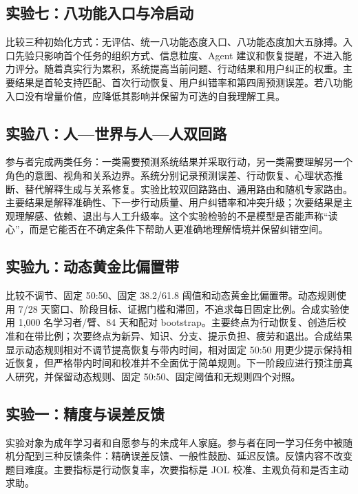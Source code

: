 \documentclass[UTF8,a4paper,11pt]{ctexart}
\begin{document}
\subsection{实验七：八功能入口与冷启动}

比较三种初始化方式：无评估、统一八功能态度入口、八功能态度加大五脉搏。入口先验只影响首个任务的组织方式、信息粒度、Agent 建议和恢复提醒，不进入能力评分。随着真实行为累积，系统提高当前问题、行动结果和用户纠正的权重。主要结果是首轮支持匹配、首次行动恢复、用户纠错率和第四周预测误差。若八功能入口没有增量价值，应降低其影响并保留为可选的自我理解工具。

\subsection{实验八：人—世界与人—人双回路}

参与者完成两类任务：一类需要预测系统结果并采取行动，另一类需要理解另一个角色的意图、视角和关系边界。系统分别记录预测误差、行动恢复、心理状态推断、替代解释生成与关系修复。实验比较双回路路由、通用路由和随机专家路由。主要结果是解释准确性、下一步行动质量、用户纠错率和冲突升级；次要结果是主观理解感、依赖、退出与人工升级率。这个实验检验的不是模型是否能声称“读心”，而是它能否在不确定条件下帮助人更准确地理解情境并保留纠错空间。

\subsection{实验九：动态黄金比偏置带}

比较不调节、固定 50:50、固定 38.2/61.8 阈值和动态黄金比偏置带。动态规则使用 7/28 天窗口、阶段目标、证据门槛和滞回，不追求每日固定比例。合成实验使用 1,000 名学习者/臂、84 天和配对 bootstrap。主要终点为行动恢复、创造后校准和在带比例；次要终点为新异、知识、分支、提示负担、疲劳和退出。合成结果显示动态规则相对不调节提高恢复与带内时间，相对固定 50:50 用更少提示保持相近恢复，但严格带内时间和校准并不全面优于简单规则。下一阶段应进行预注册真人研究，并保留动态规则、固定 50:50、固定阈值和无规则四个对照。

\subsection{实验一：精度与误差反馈}

实验对象为成年学习者和自愿参与的未成年人家庭。参与者在同一学习任务中被随机分配到三种反馈条件：精确误差反馈、一般性鼓励、延迟反馈。反馈内容不改变题目难度。主要指标是行动恢复率，次要指标是 JOL 校准、主观负荷和是否主动求助。
\end{document}
